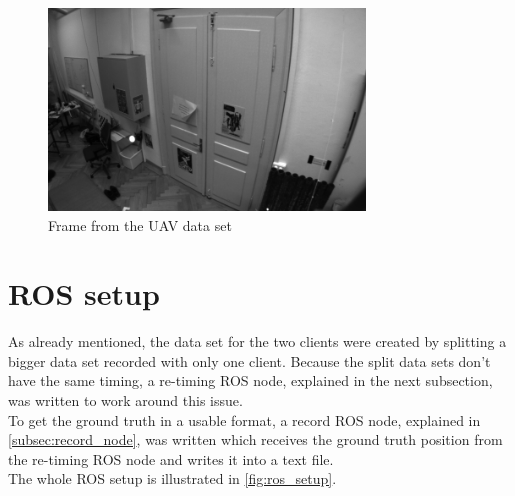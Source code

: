 \begin{figure}[H]
  \centering
  \includegraphics[width=0.75\textwidth]{images/frame0128}
  \caption{Frame from the \ac{UAV} data set}
  \label{fig:dataset_uav}
\end{figure}

\section{\acf{ROS} setup}
As already mentioned, the data set for the two clients were created by splitting a bigger data set recorded with only one client. Because the split data sets don't have the same timing, a re-timing \ac{ROS} node, explained in the next subsection, was written to work around this issue.\\
To get the ground truth in a usable format, a record \ac{ROS} node, explained in \autoref{subsec:record_node}, was written which receives the ground truth position from the re-timing \ac{ROS} node and writes it into a text file.\\

The whole \ac{ROS} setup is illustrated in \autoref{fig:ros_setup}.

